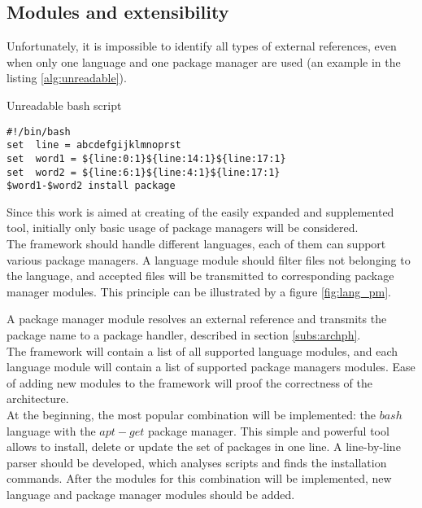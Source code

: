 \subsection{Modules and extensibility}
Unfortunately, it is impossible to identify all types of external references, even when only one language and one package manager are used (an example in the listing \ref{alg:unreadable}).
\begin{Listing} 
	\caption{Unreadable bash script}
	\label{alg:unreadable}
\begin{lstlisting}
#!/bin/bash
set  line = abcdefgijklmnoprst
set  word1 = ${line:0:1}${line:14:1}${line:17:1} 
set  word2 = ${line:6:1}${line:4:1}${line:17:1}
$word1-$word2 install package
\end{lstlisting}
\end{Listing}
Since this work is aimed at creating of the easily expanded and supplemented tool, initially only basic usage of package managers will be considered.\\
The framework should handle different languages, each of them can support various package managers.
A language module should filter files not belonging to the language, and accepted files will be transmitted to corresponding package manager modules.
This principle can be illustrated by a figure \ref{fig:lang_pm}.

A package manager module resolves an external reference and transmits the package name to a package handler, described in section \ref{subs:archph}.\\
The framework will contain a list of all supported language modules, and each language module will contain a list of supported package managers modules.
Ease of adding new modules to the framework will proof the correctness of the architecture.\\
At the beginning, the most popular combination will be implemented: the $bash$ language with the $apt-get$ package manager.
This simple and powerful tool allows to install, delete or update the set of packages in one line.
A line-by-line parser should be developed, which analyses scripts and finds the installation commands.
After the modules for this combination will be implemented, new language and package manager modules should be added.


